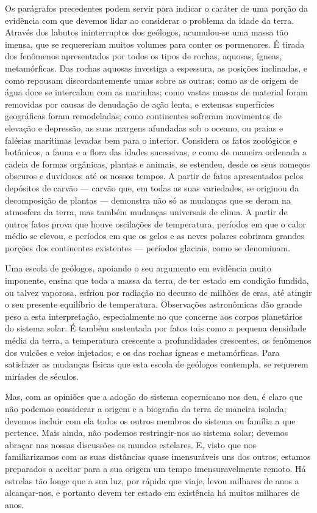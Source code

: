 \documentclass[11pt,a5paper,twoside,openany]{book}
\begin{document}
Os parágrafos precedentes podem servir para indicar o caráter de uma porção da evidência com que devemos lidar ao considerar o problema da idade da terra. Através dos labutos ininterruptos dos geólogos, acumulou-se uma massa tão imensa, que se requereriam muitos volumes para conter os pormenores. É tirada dos fenômenos apresentados por todos os tipos de rochas, aquosas, ígneas, metamórficas. Das rochas aquosas investiga a espessura, as posições inclinadas, e como repousam discordantemente umas sobre as outras; como as de origem de água doce se intercalam com as marinhas; como vastas massas de material foram removidas por causas de denudação de ação lenta, e extensas superfícies geográficas foram remodeladas; como continentes sofreram movimentos de elevação e depressão, as suas margens afundadas sob o oceano, ou praias e falésias marítimas levadas bem para o interior. Considera os fatos zoológicos e botânicos, a fauna e a flora das idades sucessivas, e como de maneira ordenada a cadeia de formas orgânicas, plantas e animais, se estendeu, desde os seus começos obscuros e duvidosos até os nossos tempos. A partir de fatos apresentados pelos depósitos de carvão — carvão que, em todas as suas variedades, se originou da decomposição de plantas — demonstra não só as mudanças que se deram na atmosfera da terra, mas também mudanças universais de clima. A partir de outros fatos prova que houve oscilações de temperatura, períodos em que o calor médio se elevou, e períodos em que os gelos e as neves polares cobriram grandes porções dos continentes existentes — períodos glaciais, como se denominam.

Uma escola de geólogos, apoiando o seu argumento em evidência muito imponente, ensina que toda a massa da terra, de ter estado em condição fundida, ou talvez vaporosa, esfriou por radiação no decurso de milhões de eras, até atingir o seu presente equilíbrio de temperatura. Observações astronômicas dão grande peso a esta interpretação, especialmente no que concerne aos corpos planetários do sistema solar. É também sustentada por fatos tais como a pequena densidade média da terra, a temperatura crescente a profundidades crescentes, os fenômenos dos vulcões e veios injetados, e os das rochas ígneas e metamórficas. Para satisfazer as mudanças físicas que esta escola de geólogos contempla, se requerem miríades de séculos.

Mas, com as opiniões que a adoção do sistema copernicano nos deu, é claro que não podemos considerar a origem e a biografia da terra de maneira isolada; devemos incluir com ela todos os outros membros do sistema ou família a que pertence. Mais ainda, não podemos restringir-nos ao sistema solar; devemos abraçar nas nossas discussões os mundos estelares. E, visto que nos familiarizamos com as suas distâncias quase imensuráveis uns dos outros, estamos preparados a aceitar para a sua origem um tempo imensuravelmente remoto. Há estrelas tão longe que a sua luz, por rápida que viaje, levou milhares de anos a alcançar-nos, e portanto devem ter estado em existência há muitos milhares de anos.
\end{document}
